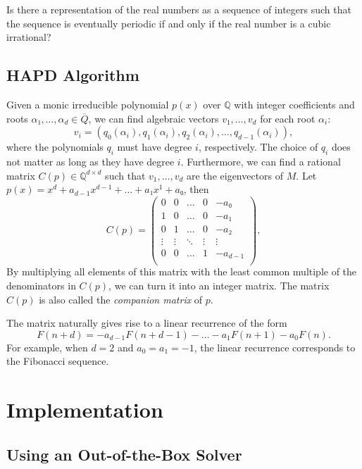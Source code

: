 \documentclass[english,version-2020-11]{uzl-thesis}
\begin{document}
\begin{problem}
  Is there a representation of the real numbers as a sequence of integers such
  that the sequence is eventually periodic if and only if the real number is a
  cubic irrational?
\end{problem}

\section{HAPD Algorithm}

Given a monic irreducible polynomial $p(x)$ over $ℚ$ with integer coefficients and roots $α₁, \dots, α_d ∈ \overline{Q}$,
we can find algebraic vectors $v_1, \dots, v_d$ for each root $α_i$:
\[
  v_i = (q_0(α_i), q_1(α_i), q_2(α_i), \dots, q_{d-1}(α_i)),
\]
where the polynomials $q_i$ must have degree $i$, respectively.
The choice of $q_i$ does not matter as long as they have degree $i$.
Furthermore, we can find a rational matrix $C(p) ∈ ℚ^{d × d}$ such that $v_1, \dots, v_d$ are the eigenvectors of $M$.
Let $p(x) = x^d + a_{d-1} x^{d-1} + \dots + a₁ x^1 + a₀$, then
\[
  C(p) =
  \begin{pmatrix}
    0 & 0 & \dots & 0 & -a₀ \\
    1 & 0 & \dots & 0 & -a₁ \\
    0 & 1 & \dots & 0 & -a₂ \\
    \vdots & \vdots & \ddots & \vdots & \vdots \\
    0 & 0 & \dots & 1 & -a_{d-1} \\
  \end{pmatrix},
\]
By multiplying all elements of this matrix with the least common multiple of the denominators in $C(p)$,
we can turn it into an integer matrix.
The matrix $C(p)$ is also called the \emph{companion matrix} of $p$.

The matrix naturally gives rise to a linear recurrence of the form
\[
  F(n + d) = -a_{d-1} F(n + d - 1) - \dots - a_1 F(n + 1) - a_0 F(n).
\]
For example, when $d = 2$ and $a_0 = a_1 = -1$, the linear recurrence
corresponds to the Fibonacci sequence.

\chapter{Implementation}

\section{Using an Out-of-the-Box Solver}
\end{document}
